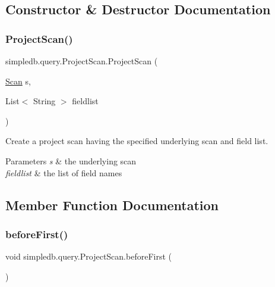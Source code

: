 \subsection{Constructor \& Destructor Documentation}
\mbox{\label{classsimpledb_1_1query_1_1ProjectScan_a897ca2e090e0978dcc3f9b1c36127b0d}} 
\subsubsection{\texorpdfstring{Project\+Scan()}{ProjectScan()}}
{\footnotesize\ttfamily simpledb.\+query.\+Project\+Scan.\+Project\+Scan (\begin{DoxyParamCaption}\item[{\hyperlink{interfacesimpledb_1_1query_1_1Scan}{Scan}}]{s,  }\item[{List$<$ String $>$}]{fieldlist }\end{DoxyParamCaption})\hspace{0.3cm}{\ttfamily [inline]}}

Create a project scan having the specified underlying scan and field list. 
\begin{DoxyParams}{Parameters}
{\em s} & the underlying scan \\
\hline
{\em fieldlist} & the list of field names \\
\hline
\end{DoxyParams}


\subsection{Member Function Documentation}
\mbox{\label{classsimpledb_1_1query_1_1ProjectScan_ab34d4470b97f47e22879911fb71eeca6}} 
\subsubsection{\texorpdfstring{before\+First()}{beforeFirst()}}
{\footnotesize\ttfamily void simpledb.\+query.\+Project\+Scan.\+before\+First (\begin{DoxyParamCaption}{ }\end{DoxyParamCaption})\hspace{0.3cm}{\ttfamily [inline]}}

